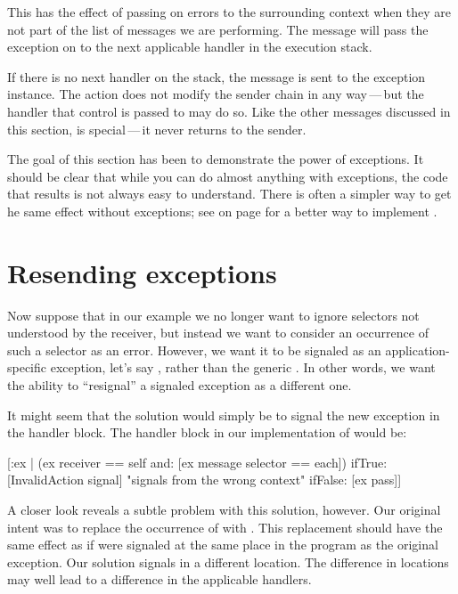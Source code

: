 \documentclass[a4paper,10pt,twoside]{book}
\begin{document}
This has the effect of passing on  errors to the surrounding context when they are not part of the list of messages we are performing. The  message will pass the exception on to the next applicable handler in the execution stack.

If there is no next handler on the stack, the  message is sent to the exception instance. The  action does not modify the sender chain in any way\,---\,but the handler that control is passed to may do so. Like the other messages discussed in this section,  is special\,---\,it never returns to the sender.

The goal of this section has been to demonstrate the power of exceptions.
It should be clear that while you can do almost anything with exceptions, the code
that results is not always easy to understand.   
There is often a simpler way to get he same effect without exceptions; see  on page \pageref{mth:simplerObjectPerfromAll} for a better way to implement .

\section{Resending exceptions}

Now suppose that in our  example we no longer want to ignore selectors not understood by the receiver, but instead we want to consider an occurrence of such a selector as an error. However, we want it to be signaled as an application-specific exception, let's say , rather than the generic . In other words, we want the ability to ``resignal'' a signaled exception as a different one.

It might seem that the solution would simply be to signal the new exception in the handler block. The handler block in our implementation of  would be:

\begin{code}{}
[:ex | (ex receiver == self and: [ex message selector == each])
	ifTrue: [InvalidAction signal]    "signals from the wrong context"
	ifFalse: [ex pass]]
\end{code}

A closer look reveals a subtle problem with this solution, however. Our original intent was to replace the occurrence of  with . This replacement should have the same effect as if  were signaled at the same place in the program as the original  exception. Our solution signals  in a different location. The difference in locations may well lead to a difference in the applicable handlers.
\end{document}
